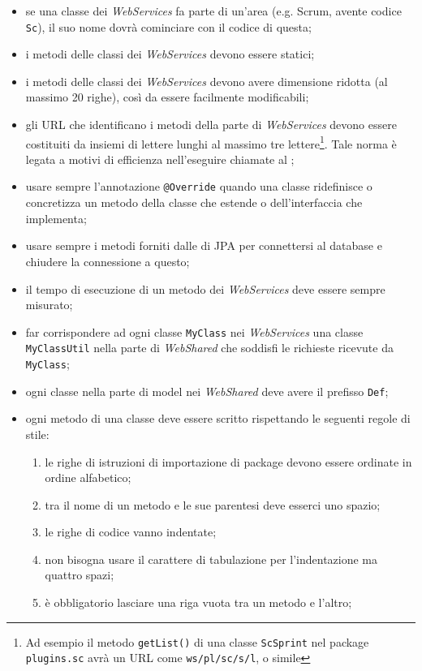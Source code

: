\begin{itemize}
	\item se una classe dei \emph{WebServices} fa parte di un'area (e.g.
	Scrum, avente codice \texttt{Sc}), il suo nome dovrà cominciare con il
	codice di questa;
	\item i metodi delle classi dei \emph{WebServices} devono essere statici;
	\item i metodi delle classi dei \emph{WebServices} devono avere dimensione
	ridotta (al massimo 20 righe), così da essere facilmente modificabili;
	\item gli URL che identificano i metodi della parte di \emph{WebServices}
	devono essere costituiti da insiemi di lettere lunghi al massimo tre
	lettere\footnote{Ad esempio il metodo \texttt{getList()} di una classe
	\texttt{ScSprint} nel package \texttt{plugins.sc} avrà un URL come
	\texttt{ws/pl/sc/s/l}, o simile}. Tale norma è legata a motivi di efficienza
	nell'eseguire chiamate  al \BKEND{};
	\item usare sempre l'annotazione \texttt{@Override} quando una classe
	ridefinisce o concretizza un metodo della classe che estende o
	dell'interfaccia che implementa;
	\item usare sempre i metodi forniti dalle  di JPA per connettersi al
	database e chiudere la connessione a questo;
	\item il tempo di esecuzione di un metodo dei \emph{WebServices} deve essere
	sempre misurato;
	\item far corrispondere ad ogni classe \texttt{MyClass} nei
	\emph{WebServices} una classe \texttt{MyClassUtil} nella parte di
	\emph{WebShared} che soddisfi le richieste  ricevute da
	\texttt{MyClass};
	\item ogni classe nella parte di model nei \emph{WebShared} deve avere il
	prefisso \texttt{Def};
	\item ogni metodo di una classe deve essere scritto rispettando le seguenti
	regole di stile:
	\begin{enumerate}
		\item le righe di istruzioni di importazione di package devono essere
		ordinate in ordine alfabetico;
		\item tra il nome di un metodo e le sue parentesi deve esserci uno spazio;
		\item le righe di codice vanno indentate;
		\item non bisogna usare il carattere di tabulazione per l'indentazione ma
		quattro spazi;
		\item è obbligatorio lasciare una riga vuota tra un metodo e l'altro;

\end{enumerate}
\end{itemize}
